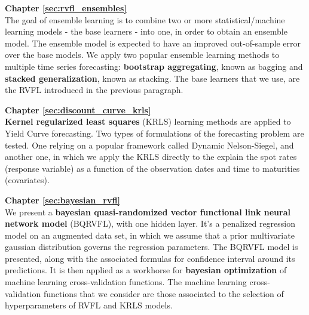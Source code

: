 \textbf{Chapter \ref{sec:rvfl_ensembles}} \\[0.2em]
The goal of ensemble learning is to combine two or more statistical/machine learning models - the base learners - into one, in order to obtain an ensemble model. The ensemble model is expected to have an improved out-of-sample error over the base models. We apply two popular ensemble learning methods to multiple time series forecasting: \textbf{bootstrap aggregating}, known as bagging and \textbf{stacked generalization}, known as stacking. The base learners that we use, are the RVFL introduced in the previous paragraph.

\textbf{Chapter \ref{sec:discount_curve_krls}} \\[0.2em]
\textbf{Kernel regularized least squares} (KRLS) learning methods are applied to Yield Curve forecasting. Two types of formulations of the forecasting problem are tested. One relying on a popular framework called Dynamic Nelson-Siegel, and another one, in which we apply the KRLS directly to the explain the spot rates (response variable) as a function of the observation dates and time to maturities (covariates).

\textbf{Chapter \ref{sec:bayesian_rvfl}} \\[0.2em]
We present a \textbf{bayesian quasi-randomized vector functional link neural network model} (BQRVFL), with one hidden layer. It's a penalized regression model on an augmented data set, in which we assume that a prior multivariate gaussian distribution governs the regression parameters. The BQRVFL model is presented, along with the associated formulas for confidence interval around its predictions. It is then applied as a workhorse for \textbf{bayesian optimization} of machine learning cross-validation functions. The machine learning cross-validation functions that we consider are those associated to the selection of hyperparameters of RVFL and KRLS models.
